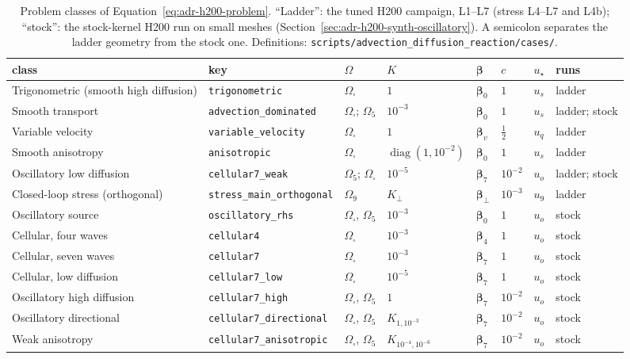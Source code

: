 \begin{table}[ht]
\centering\footnotesize
\setlength{\tabcolsep}{4pt}
\begin{tabular}{llllllll}
\toprule
class & key & $\Omega$ & $K$ & $\boldsymbol\beta$ & $c$ & $u_\star$ & runs\\
\midrule
Trigonometric (smooth high diffusion) & \texttt{trigonometric} & $\Omega_\square$ & $1$ & $\boldsymbol\beta_0$ & $1$ & $u_s$ & ladder\\
Smooth transport & \texttt{advection\_dominated} & $\Omega_\square$; $\Omega_5$ & $10^{-3}$ & $\boldsymbol\beta_0$ & $1$ & $u_s$ & ladder; stock\\
Variable velocity & \texttt{variable\_velocity} & $\Omega_\square$ & $1$ & $\boldsymbol\beta_v$ & $\tfrac12$ & $u_q$ & ladder\\
Smooth anisotropy & \texttt{anisotropic} & $\Omega_\square$ & $\operatorname{diag}(1,10^{-2})$ & $\boldsymbol\beta_0$ & $1$ & $u_s$ & ladder\\
Oscillatory low diffusion & \texttt{cellular7\_weak} & $\Omega_5$; $\Omega_\square$ & $10^{-5}$ & $\boldsymbol\beta_7$ & $10^{-2}$ & $u_o$ & ladder; stock\\
Closed-loop stress (orthogonal) & \texttt{stress\_main\_orthogonal} & $\Omega_9$ & $K_\perp$ & $\boldsymbol\beta_\perp$ & $10^{-3}$ & $u_9$ & ladder\\
\midrule
Oscillatory source & \texttt{oscillatory\_rhs} & $\Omega_\square$, $\Omega_5$ & $10^{-3}$ & $\boldsymbol\beta_0$ & $1$ & $u_o$ & stock\\
Cellular, four waves & \texttt{cellular4} & $\Omega_\square$ & $10^{-3}$ & $\boldsymbol\beta_4$ & $1$ & $u_o$ & stock\\
Cellular, seven waves & \texttt{cellular7} & $\Omega_\square$ & $10^{-3}$ & $\boldsymbol\beta_7$ & $1$ & $u_o$ & stock\\
Cellular, low diffusion & \texttt{cellular7\_low} & $\Omega_\square$ & $10^{-5}$ & $\boldsymbol\beta_7$ & $1$ & $u_o$ & stock\\
Oscillatory high diffusion & \texttt{cellular7\_high} & $\Omega_\square$, $\Omega_5$ & $1$ & $\boldsymbol\beta_7$ & $10^{-2}$ & $u_o$ & stock\\
Oscillatory directional & \texttt{cellular7\_directional} & $\Omega_\square$, $\Omega_5$ & $K_{1,10^{-3}}$ & $\boldsymbol\beta_7$ & $10^{-2}$ & $u_o$ & stock\\
Weak anisotropy & \texttt{cellular7\_anisotropic} & $\Omega_\square$, $\Omega_5$ & $K_{10^{-4},10^{-6}}$ & $\boldsymbol\beta_7$ & $10^{-2}$ & $u_o$ & stock\\
\bottomrule
\end{tabular}
\caption{Problem classes of Equation~\eqref{eq:adr-h200-problem}. ``Ladder'': the tuned H200
campaign, L1--L7 (stress L4--L7 and L4b); ``stock'': the stock-kernel H200 run on small meshes
(Section~\ref{sec:adr-h200-synth-oscillatory}). A semicolon separates the ladder geometry from the
stock one. Definitions: \texttt{scripts/advection\_diffusion\_reaction/cases/}.}
\label{tab:adr-h200-cases}
\end{table}

